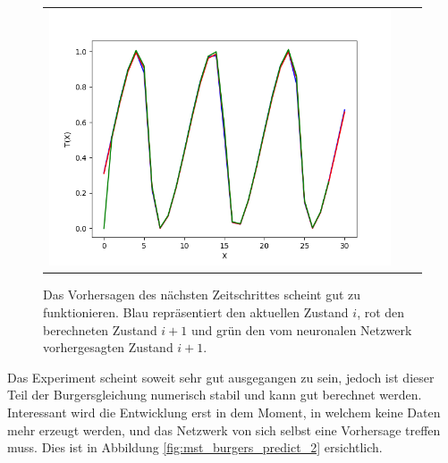 \begin{figure}
\begin{tabular}{ccc}
		\includegraphics[scale=0.27]{learning/img/burger_predict20.png}
	\end{tabular}
	\label{fig:mst_burgers_predict_1}
	\caption{Das Vorhersagen des nächsten Zeitschrittes scheint gut zu funktionieren. Blau repräsentiert den aktuellen Zustand $i$, rot den berechneten Zustand $i+1$ und grün den vom neuronalen Netzwerk vorhergesagten Zustand $i+1$. }
\end{figure}

Das Experiment scheint soweit sehr gut ausgegangen zu sein, jedoch ist dieser Teil der Burgersgleichung numerisch stabil und kann gut berechnet werden. Interessant wird die Entwicklung erst in dem Moment, in welchem keine Daten mehr erzeugt werden, und das Netzwerk von sich selbst eine Vorhersage treffen muss. Dies ist in Abbildung \ref{fig:mst_burgers_predict_2} ersichtlich.

